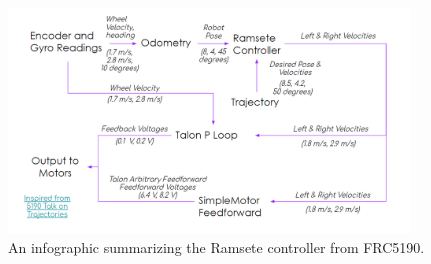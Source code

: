 \begin{figure}[htp]
\centering
\includegraphics[width=0.95\textwidth, angle=0]{Meetings/March/03-22-22/03-22-22 1.png}
\caption{An infographic summarizing the Ramsete controller from FRC5190.}
\label{fig:032222_1}
\end{figure}




